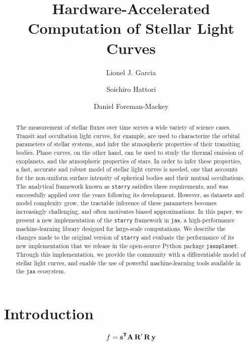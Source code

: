 \documentclass[modern]{aastex631}
\begin{document}
\title{Hardware-Accelerated Computation of Stellar Light Curves}

\author{Lionel J. Garcia}
\author{Soichiro Hattori}
\author{Daniel Foreman-Mackey}

\keywords{}

\begin{abstract}
    The measurement of stellar fluxes over time serves a wide variety of science cases. Transit and occultation light curves, for example, are used to characterize the orbital parameters of stellar systems, and infer the atmospheric properties of their transiting bodies. Phase curves, on the other hand, can be used to study the thermal emission of exoplanets, and the atmospheric properties of stars. In order to infer these properties, a fast, accurate and robust model of stellar light curves is needed, one that accounts for the non-uniform surface intensity of spherical bodies and their mutual occultations. The analytical framework known as \texttt{starry} satisfies these requirements, and was successfully applied over the years following its development. However, as datasets and model complexity grow, the tractable inference of these parameters becomes increasingly challenging, and often motivates biased approximations. In this paper, we present a new implementation of the \texttt{starry} framework in \texttt{jax}, a high-performance machine-learning library designed for large-scale computations. We describe the changes made to the original version of \texttt{starry} and evaluate the performance of its new implementation that we release in the open-source Python package \texttt{jaxoplanet}. Through this implementation, we provide the community with a differentiable model of stellar light curves, and enable the use of powerful machine-learning tools available in the \texttt{jax} ecosystem. \gitlink{}

\end{abstract}

\section*{Introduction}

\begin{equation}\label{eq:starry}
    f = \bvec{s}^{\boldsymbol{\mathsf{T}}} \bvec{A} \, \bvec{R'} \, \bvec{R} \, \bvec{y}
\end{equation}


\end{document}
